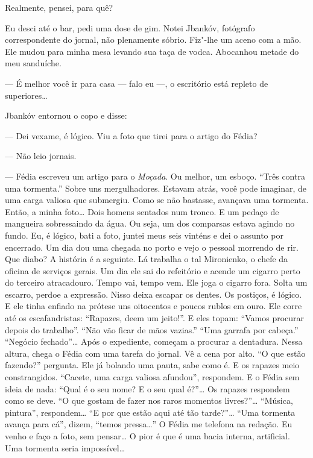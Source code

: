 Realmente, pensei, para quê?

\bigskip

Eu desci até o bar, pedi uma dose de gim. Notei Jbankóv, fotógrafo
correspondente do jornal, não plenamente sóbrio. Fiz"-lhe um aceno com a
mão. Ele mudou para minha mesa levando sua taça de vodca. Abocanhou
metade do meu sanduíche.

--- É melhor você ir para casa --- falo eu ---, o escritório está
repleto de superiores\ldots{}

Jbankóv entornou o copo e disse:

--- Dei vexame, é lógico. Viu a foto que tirei para o artigo do Fédia?

--- Não leio jornais.

--- Fédia escreveu um artigo para o \emph{Moçada}. Ou melhor, um esboço.
``Três contra uma tormenta.'' Sobre uns
mergulhadores. Estavam atrás, você pode imaginar, de uma carga valiosa
que submergiu. Como se não bastasse, avançava uma tormenta. Então, a
minha foto\ldots{} Dois homens sentados num tronco. E um pedaço de mangueira
sobressaindo da água. Ou seja, um dos comparsas estava agindo no fundo.
Eu, é lógico, bati a foto, juntei meus seis vinténs e dei o assunto por
encerrado. Um dia dou uma chegada no porto e vejo o pessoal morrendo de
rir. Que diabo? A história é a seguinte. Lá trabalha o tal Mironienko, o
chefe da oficina de serviços gerais. Um dia ele sai do refeitório e
acende um cigarro perto do terceiro atracadouro. Tempo vai, tempo vem.
Ele joga o cigarro fora. Solta um escarro, perdoe a expressão. Nisso
deixa escapar os dentes. Os postiços, é lógico. E ele tinha enfiado na
prótese uns oitocentos e poucos rublos em ouro. Ele corre até os
escafandristas: ``Rapazes, deem um jeito!''. E eles topam: ``Vamos
procurar depois do trabalho''. ``Não vão ficar de mãos vazias.'' ``Uma
garrafa por cabeça.'' ``Negócio fechado''\ldots{} Após o expediente, começam
a procurar a dentadura. Nessa altura, chega o Fédia com uma tarefa do
jornal. Vê a cena por alto. ``O que estão fazendo?'' pergunta. Ele já
bolando uma pauta, sabe como é. E os rapazes meio constrangidos.
``Cacete, uma carga valiosa afundou'', respondem. E o Fédia sem ideia de
nada: ``Qual é o seu nome? E o seu qual é?''\ldots{} Os rapazes respondem
como se deve. ``O que gostam de fazer nos raros momentos livres?''\ldots{}
``Música, pintura'', respondem\ldots{} ``E por que estão aqui até tão
tarde?''\ldots{} ``Uma tormenta avança para cá'', dizem, ``temos pressa\ldots{}''
O Fédia me telefona na redação. Eu venho e faço a foto, sem pensar\ldots{} O
pior é que é uma bacia interna, artificial. Uma tormenta seria
impossível\ldots{}


